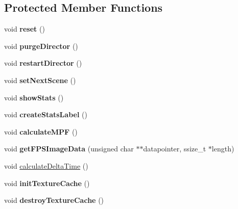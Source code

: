 \subsection*{Protected Member Functions}
\begin{DoxyCompactItemize}
\item 
\mbox{\label{classDirector_ac1463a0c5fcea59162128d62d70c090e}} 
void {\bfseries reset} ()
\item 
\mbox{\label{classDirector_a3316fe959fdd6e0a4ea5023068e63605}} 
void {\bfseries purge\+Director} ()
\item 
\mbox{\label{classDirector_ae92d3b82da0b5f76333156214b504ff0}} 
void {\bfseries restart\+Director} ()
\item 
\mbox{\label{classDirector_af497c18cc3d9f7a26fc7877e3b8d66d1}} 
void {\bfseries set\+Next\+Scene} ()
\item 
\mbox{\label{classDirector_a2e490b9261f36c4cd09fa5609b3c66a5}} 
void {\bfseries show\+Stats} ()
\item 
\mbox{\label{classDirector_a93bdeb13f8b3bed33418dcfc21db25fb}} 
void {\bfseries create\+Stats\+Label} ()
\item 
\mbox{\label{classDirector_ae483b4f8bf06f869ce5253d980b0cab5}} 
void {\bfseries calculate\+M\+PF} ()
\item 
\mbox{\label{classDirector_aa05a81e87c1c3fdf84af0fab3ee08ccb}} 
void {\bfseries get\+F\+P\+S\+Image\+Data} (unsigned char $\ast$$\ast$datapointer, ssize\+\_\+t $\ast$length)
\item 
void \hyperlink{classDirector_a74f5e65404e0ce2d6336d52ce68640ac}{calculate\+Delta\+Time} ()
\item 
\mbox{\label{classDirector_a3999fb075f86b58f5a5a2cfa471a8ba6}} 
void {\bfseries init\+Texture\+Cache} ()
\item 
\mbox{\label{classDirector_a4b6f22af2234cbdc5a9735ed2b1946b2}} 
void {\bfseries destroy\+Texture\+Cache} ()
\item 
$$
\end{DoxyCompactItemize}
